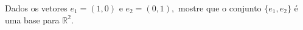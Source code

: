 \documentclass[10pt,a4paper]{article}
\begin{document}
\begin{minipage}[c]{0.5\textwidth}
Dados os vetores $e_1=(1,0)$  e $e_2=(0,1),$ mostre que o conjunto $\{e_1,e_2\}$ é uma base para $\mathbb{R}^2.$ 
\end{minipage}
\end{document}
